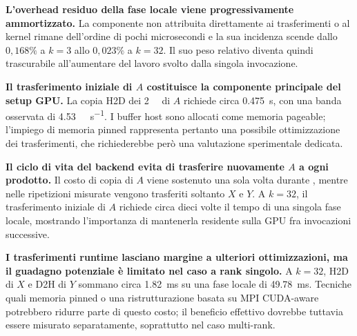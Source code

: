 \textbf{L'overhead residuo della fase locale viene progressivamente
ammortizzato.}
La componente non attribuita direttamente ai trasferimenti o al kernel
rimane dell'ordine di pochi microsecondi e la sua incidenza scende dallo
$0{,}168\%$ a $k=3$ allo $0{,}023\%$ a $k=32$. Il suo peso relativo diventa
quindi trascurabile all'aumentare del lavoro svolto dalla singola
invocazione.

\textbf{Il trasferimento iniziale di $A$ costituisce la componente principale
del setup GPU.}
La copia H2D dei \SI{2}{\gibi\byte} di $A$ richiede circa
\SI{0.475}{\second}, con una banda osservata di
\SI{4.53}{\giga\byte\per\second}. I buffer host sono allocati come memoria
pageable; l'impiego di memoria pinned rappresenta pertanto una possibile
ottimizzazione dei trasferimenti, che richiederebbe però una valutazione
sperimentale dedicata.

\textbf{Il ciclo di vita del backend evita di trasferire nuovamente $A$ a
ogni prodotto.}
Il costo di copia di $A$ viene sostenuto una sola volta durante
, mentre nelle ripetizioni misurate vengono
trasferiti soltanto $X$ e $Y$. A $k=32$, il trasferimento iniziale di $A$
richiede circa dieci volte il tempo di una singola fase locale, mostrando
l'importanza di mantenerla residente sulla GPU fra invocazioni successive.

\textbf{I trasferimenti runtime lasciano margine a ulteriori ottimizzazioni,
ma il guadagno potenziale è limitato nel caso a rank singolo.}
A $k=32$, H2D di $X$ e D2H di $Y$ sommano circa
\SI{1.82}{\milli\second} su una fase locale di
\SI{49.78}{\milli\second}. Tecniche quali memoria pinned o una
ristrutturazione basata su MPI CUDA-aware potrebbero ridurre parte di questo
costo; il beneficio effettivo dovrebbe tuttavia essere misurato
separatamente, soprattutto nel caso multi-rank.